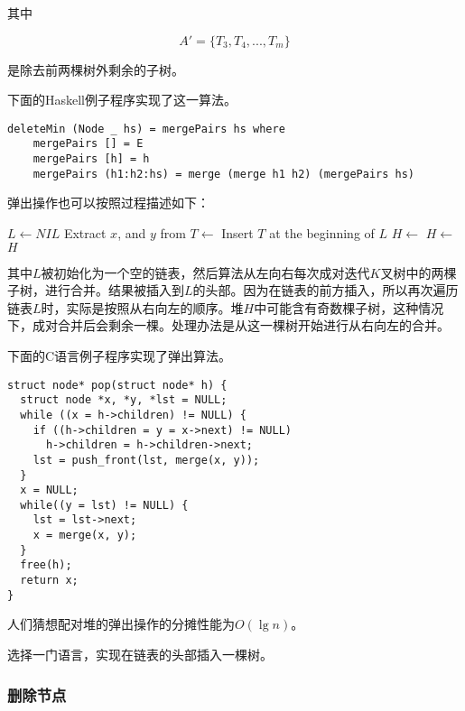 \documentclass[UTF8]{article}
\begin{document}
其中

\[
A' = \{ T_3, T_4, ..., T_m\}
\]

是除去前两棵树外剩余的子树。

下面的Haskell例子程序实现了这一算法。

\lstset{language=Haskell}
\begin{lstlisting}
deleteMin (Node _ hs) = mergePairs hs where
    mergePairs [] = E
    mergePairs [h] = h
    mergePairs (h1:h2:hs) = merge (merge h1 h2) (mergePairs hs)
\end{lstlisting}

弹出操作也可以按照过程描述如下：

\begin{algorithmic}[1]
  \State $L \gets NIL$
    \State Extract $x$, and $y$ from 
    \State $T \gets $ 
    \State Insert $T$ at the beginning of $L$
  \EndFor
  \State $H \gets $  
    \State $H \gets $ 
  \EndFor
  \State \Return $H$
\EndFunction
\end{algorithmic}

其中$L$被初始化为一个空的链表，然后算法从左向右每次成对迭代$K$叉树中的两棵子树，进行合并。结果被插入到$L$的头部。因为在链表的前方插入，所以再次遍历链表$L$时，实际是按照从右向左的顺序。堆$H$中可能含有奇数棵子树，这种情况下，成对合并后会剩余一棵。处理办法是从这一棵树开始进行从右向左的合并。

下面的C语言例子程序实现了弹出算法。

\lstset{language=C}
\begin{lstlisting}
struct node* pop(struct node* h) {
  struct node *x, *y, *lst = NULL;
  while ((x = h->children) != NULL) {
    if ((h->children = y = x->next) != NULL)
      h->children = h->children->next;
    lst = push_front(lst, merge(x, y));
  }
  x = NULL;
  while((y = lst) != NULL) {
    lst = lst->next;
    x = merge(x, y);
  }
  free(h);
  return x;
}
\end{lstlisting}

人们猜想配对堆的弹出操作的分摊性能为$O(\lg n)$\cite{pairing-heap}。

\begin{Exercise}
选择一门语言，实现在链表的头部插入一棵树。
\end{Exercise}

\subsubsection{删除节点}
\end{document}
